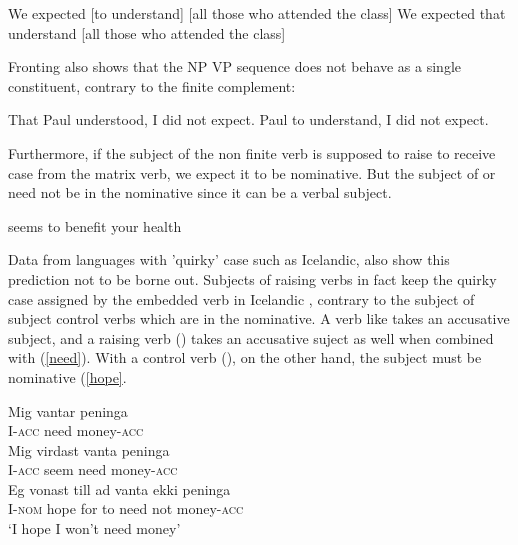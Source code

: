 \documentclass[output=paper]{langsci/langscibook}
\begin{document}
 \begin{exe}
\ex \begin{xlist}
\ex We expected [to understand] [all those who attended the class] \label{HNPS}
\ex * We expected that understand [all those who attended the class]
\end{xlist}	
\end{exe}

Fronting also shows that the NP VP sequence does not behave as a single constituent, contrary to the finite complement:

 \begin{exe}
\ex \begin{xlist}
\ex That Paul understood, I did not expect.
\ex * Paul to understand, I did not expect.
\end{xlist}	
\end{exe}


 Furthermore, if the subject of the non finite verb is supposed to raise to receive case from the matrix verb, we expect it to be nominative. 
 But the subject of  or  need not be in the nominative since it can be a verbal subject.
 
	
\begin{exe}
 seems to benefit your health	
\end{exe}

Data from languages with 'quirky' case such as Icelandic, also show this prediction not to be borne out.  Subjects of raising verbs in fact keep the quirky case assigned by the embedded verb in Icelandic \citep{Zaenenetal1985}, contrary to the subject of subject control verbs which are in the nominative. A verb like  takes an accusative subject, and a raising verb () takes an accusative suject as well when combined with  (\ref{need}). With a control verb (), on the other hand, the subject must be nominative (\ref{hope}.

\begin{exe}
\ex \begin{xlist}
\ex \gll Mig vantar peninga \\
I-\textsc{acc} need money-\textsc{acc} \\
\ex \gll Mig virdast vanta peninga \label{need} \\
I-\textsc{acc} seem need money-\textsc{acc} \\
\ex \gll Eg vonast till ad vanta ekki peninga \label{hope} \\
I-\textsc{nom} hope for to need not money-\textsc{acc} \\
\glt `I hope I won't need money'
	\end{xlist}	
	
\end{exe}
\end{document}
